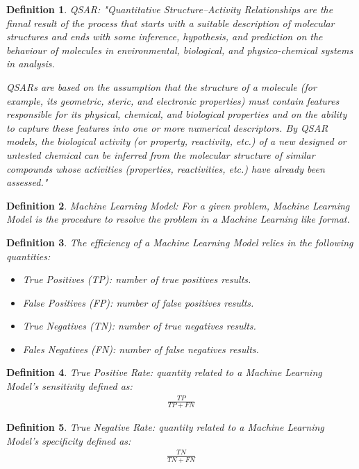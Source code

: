 \documentclass[12pt,letterpaper]{article}
\newtheorem{definition}{Definition}
\begin{document}
\begin{multicols}{2}
\begin{definition}
QSAR: "Quantitative Structure–Activity Relationships are the finnal result of the
process that starts with a suitable description of molecular structures and ends with
some inference, hypothesis, and prediction on the behaviour of molecules in environmental, biological, and physico-chemical systems in analysis.\par
QSARs are based on the assumption that the structure of a molecule (for example,
its geometric, steric, and electronic properties) must contain features responsible for
its physical, chemical, and biological properties and on the ability to capture these
features into one or more numerical descriptors. By QSAR models, the biological
activity (or property, reactivity, etc.) of a new designed or untested chemical can be
inferred from the molecular structure of similar compounds whose activities
(properties, reactivities, etc.) have already been assessed."\cite{DescriptorsBookClassification}
\end{definition}

\begin{definition}
Machine Learning Model: For a given problem, Machine Learning Model is the procedure to resolve the problem in a Machine Learning like format. 
\end{definition}

\begin{definition}
The efficiency of a Machine Learning Model relies in the following quantities:
\begin{itemize}
\item True Positives (TP): number of true positives results.
\item False Positives (FP): number of false positives results.
\item True Negatives (TN): number of true negatives results.
\item Fales Negatives (FN): number of false negatives results.
\end{itemize}
\end{definition}

\begin{definition}
True Positive Rate: quantity related to a Machine Learning Model's sensitivity defined as:
\begin{align}
\frac{TP}{TP+FN}
\end{align}
\end{definition}

\begin{definition}
True Negative Rate: quantity related to a Machine Learning Model's specificity defined as:
\begin{align}
\frac{TN}{TN+FN}
\end{align}
\end{definition}


\end{multicols}
\end{document}
